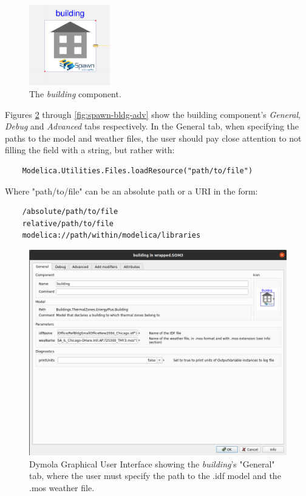 \documentclass{article}
\begin{document}
\begin{figure}
    \centering
    \includegraphics[width=100pt]{Figures/spwnBldg.png}
    \caption{The \textit{building} component.}
    \label{fig:spawn-bldg}
\end{figure}

Figures \ref{fig:spawn-bldg-gen} through \ref{fig:spawn-bldg-adv} show the building component's \textit{General}, \textit{Debug} and \textit{Advanced} tabs respectively. In the General tab, when specifying the paths to the model and weather files, the user should pay close attention to not filling the field with a string, but rather with:
\begin{verbatim}
    Modelica.Utilities.Files.loadResource("path/to/file")
\end{verbatim}
Where "path/to/file" can be an absolute path or a URI in the form:
\begin{verbatim}
    /absolute/path/to/file
    relative/path/to/file
    modelica://path/within/modelica/libraries
\end{verbatim}

\begin{figure}
    \centering
    \includegraphics[width=400pt]{Figures/spwn_bldg_general.png}
    \caption{Dymola Graphical User Interface showing the \textit{building}'s "General" tab, where the user must specify the path to the .idf model and the .mos weather file.}
    \label{fig:spawn-bldg-gen}
\end{figure}
\end{document}

